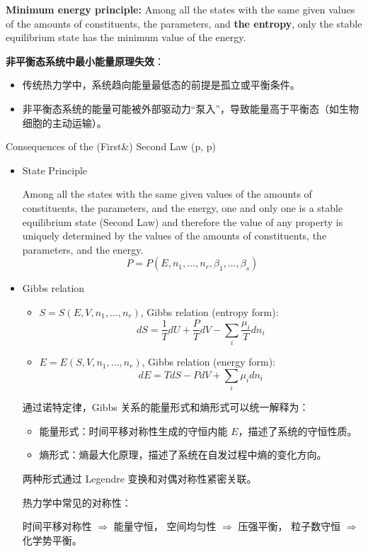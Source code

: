 \textbf{Minimum energy principle:} Among all the states with the same given values of the amounts of constituents, the parameters, and \textbf{the entropy}, only the stable equilibrium state has the minimum value of the energy.
\begin{add}
    \textbf{非平衡态系统中最小能量原理失效}：
        \begin{itemize}
            \item 传统热力学中，系统趋向能量最低态的前提是孤立或平衡条件。
            \item 非平衡态系统的能量可能被外部驱动力“泵入”，导致能量高于平衡态（如生物细胞的主动运输）。
        \end{itemize}
\end{add}
\begin{thm}\label{cfsl3}
    Consequences of the (First\&) Second Law (p\pageref{cfsl1}\;,\; p\pageref{cfsl2})
\begin{itemize}
    \item State Principle
    
    Among all the states with the same given values of the amounts of constituents, the parameters, 
    and the energy, one and only one is a stable equilibrium state (Second Law) and 
    therefore the value of any property is uniquely determined by the values of 
    the amounts of constituents, the parameters, and the energy.
    \[
    P = P(E, n_1, \ldots, n_r, \beta_1, \ldots, \beta_s)
    \] 
    \item Gibbs relation
    \begin{itemize}
        \item 
        \(
        S = S(E, V, n_1, \dots, n_r)
        \),        
        Gibbs relation (entropy form):
\[
dS = \frac{1}{T} dU + \frac{P}{T} dV - \sum_i \frac{\mu_i}{T} dn_i
\]
        \item 
        \(
        E = E(S, V, n_1, \dots, n_r)
        \),        
        Gibbs relation (energy form):
        \[
        dE = T dS - P dV + \sum_i \mu_i dn_i
        \]
    \end{itemize}
    \begin{add}
        通过诺特定律，Gibbs 关系的能量形式和熵形式可以统一解释为：
\begin{itemize}
    \item 能量形式：时间平移对称性生成的守恒内能 \(E\)，描述了系统的守恒性质。
    \item 熵形式：熵最大化原理，描述了系统在自发过程中熵的变化方向。
\end{itemize}
        两种形式通过 Legendre 变换和对偶对称性紧密关联。
    \begin{zhu}
        热力学中常见的对称性：

    时间平移对称性 $\Rightarrow$ 能量守恒，
    空间均匀性 $\Rightarrow$ 压强平衡，
    粒子数守恒 $\Rightarrow$ 化学势平衡。
    \end{zhu}
    \end{add}
\end{itemize}
\end{thm}

